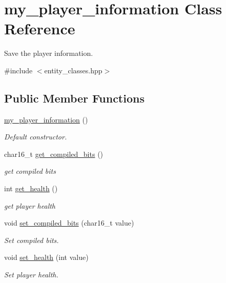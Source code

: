 \hypertarget{classmy__player__information}{}\section{my\+\_\+player\+\_\+information Class Reference}
\label{classmy__player__information}


Save the player information.  




{\ttfamily \#include $<$entity\+\_\+classes.\+hpp$>$}

\subsection*{Public Member Functions}
\begin{DoxyCompactItemize}
\item 
\hyperlink{classmy__player__information_a32ffeb6d9e2850542685e4fb40e28f9a}{my\+\_\+player\+\_\+information} ()
\begin{DoxyCompactList}\small\item\em Default constructor. \end{DoxyCompactList}\item 
char16\+\_\+t \hyperlink{classmy__player__information_a065c0e06903f41d5ecfcadbf7bd0bb12}{get\+\_\+compiled\+\_\+bits} ()
\begin{DoxyCompactList}\small\item\em get compiled bits \end{DoxyCompactList}\item 
int \hyperlink{classmy__player__information_a627d9bfc027e556998519c7ff9eff157}{get\+\_\+health} ()
\begin{DoxyCompactList}\small\item\em get player health \end{DoxyCompactList}\item 
void \hyperlink{classmy__player__information_a0cbbe520cb8591e71f1ac4164c9536d2}{set\+\_\+compiled\+\_\+bits} (char16\+\_\+t value)
\begin{DoxyCompactList}\small\item\em Set compiled bits. \end{DoxyCompactList}\item 
void \hyperlink{classmy__player__information_ae7c84c2a5a688d61f9452c78d6e8e82e}{set\+\_\+health} (int value)
\begin{DoxyCompactList}\small\item\em Set player health. \end{DoxyCompactList}\end{DoxyCompactItemize}


